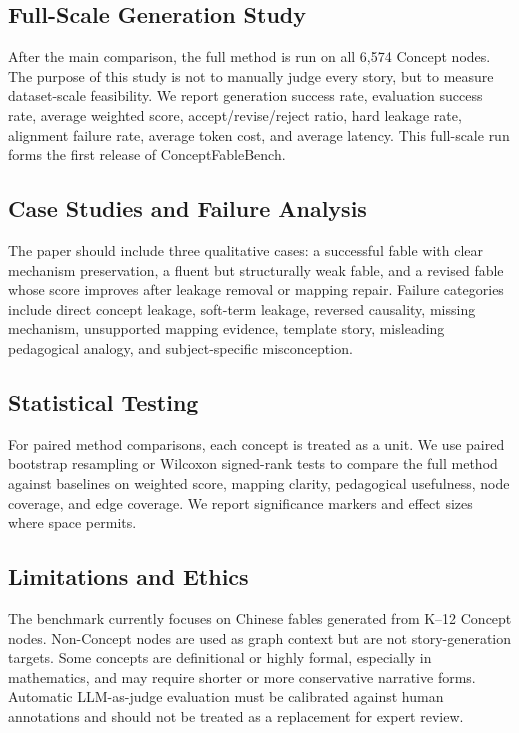 \documentclass[letterpaper]{article} %
\begin{document}
\subsection{Full-Scale Generation Study}

After the main comparison, the full method is run on all 6,574 Concept nodes. The purpose of this study is not to manually judge every story, but to measure dataset-scale feasibility. We report generation success rate, evaluation success rate, average weighted score, accept/revise/reject ratio, hard leakage rate, alignment failure rate, average token cost, and average latency. This full-scale run forms the first release of ConceptFableBench.

\subsection{Case Studies and Failure Analysis}

The paper should include three qualitative cases: a successful fable with clear mechanism preservation, a fluent but structurally weak fable, and a revised fable whose score improves after leakage removal or mapping repair. Failure categories include direct concept leakage, soft-term leakage, reversed causality, missing mechanism, unsupported mapping evidence, template story, misleading pedagogical analogy, and subject-specific misconception.

\subsection{Statistical Testing}

For paired method comparisons, each concept is treated as a unit. We use paired bootstrap resampling or Wilcoxon signed-rank tests to compare the full method against baselines on weighted score, mapping clarity, pedagogical usefulness, node coverage, and edge coverage. We report significance markers and effect sizes where space permits.

\subsection{Limitations and Ethics}

The benchmark currently focuses on Chinese fables generated from K--12 Concept nodes. Non-Concept nodes are used as graph context but are not story-generation targets. Some concepts are definitional or highly formal, especially in mathematics, and may require shorter or more conservative narrative forms. Automatic LLM-as-judge evaluation must be calibrated against human annotations and should not be treated as a replacement for expert review.
\end{document}
